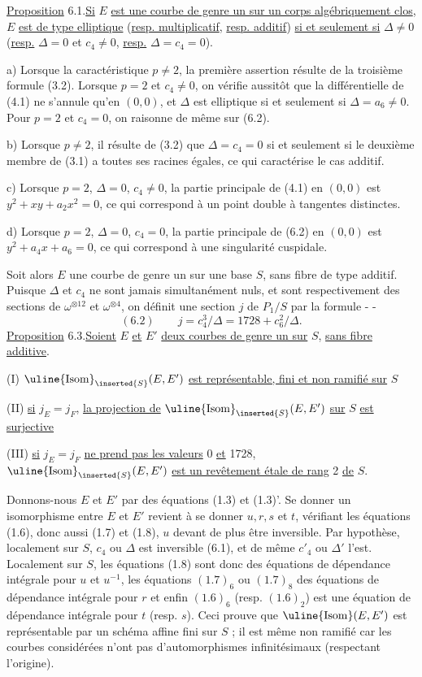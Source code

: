\uline{Proposition} 6.1.\quad \uline{Si} $E$ \uline{est une courbe de genre un sur un corps algébriquement clos}, $E$ \uline{est de type elliptique} (\uline{resp. multiplicatif}, \uline{resp. additif}) \uline{si et seulement si} $\Delta\ne0$ (\uline{resp.} $\Delta=0$ et $c_4\ne0$, \uline{resp.} $\Delta=c_4=0$).

a) Lorsque la caractéristique $p\ne2$, la première assertion résulte de la troisième formule (3.2). Lorsque $p=2$ et $c_4\ne0$, on vérifie aussitôt que la différentielle de (4.1) ne s'annule qu'en $(0,0)$, et $\Delta$ est elliptique si et seulement si $\Delta=a_6\ne0$. Pour $p=2$ et $c_4=0$, on raisonne de même sur (6.2).

b) Lorsque $p\ne2$, il résulte de (3.2) que $\Delta=c_4=0$ si et seulement si le deuxième membre de (3.1) a toutes ses racines égales, ce qui caractérise le cas additif.

c) Lorsque $p=2$, $\Delta=0$, $c_4\ne0$, la partie principale de (4.1) en $(0,0)$ est $y^2+xy+a_2x^2=0$, ce qui correspond à un point double à tangentes distinctes.

d) Lorsque $p=2$, $\Delta=0$, $c_4=0$, la partie principale de (6.2) en $(0,0)$ est $y^2+a_4x+a_6=0$, ce qui correspond à une singularité cuspidale.

Soit alors $E$ une courbe de genre un sur une base $S$, sans fibre de type additif. Puisque $\Delta$ et $c_4$ ne sont jamais simultanément nuls, et sont respectivement des sections de $\omega^{\otimes12}$ et $\omega^{\otimes4}$, on définit une section $j$ de $P_1/S$ par la formule
-  -
\[
(6.2)\qquad j=c_4^3/\Delta=1728+c_6^2/\Delta.
\]
\uline{Proposition} 6.3.\quad \uline{Soient} $E$ \uline{et} $E'$ \uline{deux courbes de genre un sur} $S$, \uline{sans fibre additive}.

(I) $\uline{\mathrm{Isom}}_{\inserted{S}}(E,E')$ \uline{est représentable, fini et non ramifié sur} $S$

(II) \uline{si} $j_E=j_F$, \uline{la projection de} $\uline{\mathrm{Isom}}_{\inserted{S}}(E,E')$ \uline{sur} $S$ \uline{est surjective}

(III) \uline{si} $j_E=j_F$ \uline{ne prend pas les valeurs} 0 \uline{et} 1728, $\uline{\mathrm{Isom}}_{\inserted{S}}(E,E')$ \uline{est un revêtement étale de rang} 2 \uline{de} $S$.

Donnons-nous $E$ et $E'$ par des équations (1.3) et (1.3)'. Se donner un isomorphisme entre $E$ et $E'$ revient à se donner $u,r,s$ et $t$, vérifiant les équations (1.6), donc aussi (1.7) et (1.8), $u$ devant de plus être inversible. Par hypothèse, localement sur $S$, $c_4$ ou $\Delta$ est inversible (6.1), et de même $c'_4$ ou $\Delta'$ l'est. Localement sur $S$, les équations (1.8) sont donc des équations de dépendance intégrale pour $u$ et $u^{-1}$, les équations $(1.7)_6$ ou $(1.7)_8$ des équations de dépendance intégrale pour $r$ et enfin $(1.6)_6$ (resp. $(1.6)_2$) est une équation de dépendance intégrale pour $t$ (resp. $s$). Ceci prouve que $\uline{\mathrm{Isom}}(E,E')$ est représentable par un schéma affine fini sur $S$ ; il est même non ramifié car les courbes considérées n'ont pas d'automorphismes infinitésimaux (respectant l'origine).

